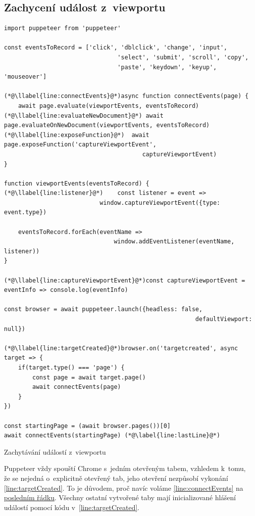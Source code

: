 \documentclass[12pt, a4paper, twoside]{article}
\newcommand{\codefigureSpacing}{1.2}
\begin{document}
	\subsection{Zachycení událost z~viewportu}
	\label{sub_sec:captureViewportEvents}
	\begin{codefigure}[H]
		\renewcommand\baselinestretch{\codefigureSpacing}
	\begin{lstlisting}[style=MyJavaScript]
import puppeteer from 'puppeteer'

const eventsToRecord = ['click', 'dblclick', 'change', 'input', 
                                'select', 'submit', 'scroll', 'copy', 
                                'paste', 'keydown', 'keyup', 'mouseover']

(*@\llabel{line:connectEvents}@*)async function connectEvents(page) {
	await page.evaluate(viewportEvents, eventsToRecord)
(*@\llabel{line:evaluateNewDocument}@*)	await page.evaluateOnNewDocument(viewportEvents, eventsToRecord)
(*@\llabel{line:exposeFunction}@*)	await page.exposeFunction('captureViewportEvent', 
	                                   captureViewportEvent)
}

function viewportEvents(eventsToRecord) {
(*@\llabel{line:listener}@*)	const listener = event => 
                           window.captureViewportEvent({type: event.type})
	
	eventsToRecord.forEach(eventName =>
	                           window.addEventListener(eventName, listener))
}

(*@\llabel{line:captureViewportEvent}@*)const captureViewportEvent = eventInfo => console.log(eventInfo)

const browser = await puppeteer.launch({headless: false, 
	                                                  defaultViewport: null})

(*@\llabel{line:targetCreated}@*)browser.on('targetcreated', async target => {
	if(target.type() === 'page') {
		const page = await target.page()
		await connectEvents(page)
	}
})

const startingPage = (await browser.pages())[0]
await connectEvents(startingPage) (*@\label{line:lastLine}@*)
	\end{lstlisting}
	\caption{Zachytávání událostí z~viewportu}
	\end{codefigure}
	\newpage
	Puppeteer vždy spouští Chrome s~jedním otevřeným tabem, vzhledem k~tomu, že se nejedná o~explicitně otevřený tab, jeho otevření nezpůsobí vykonání \ref{line:targetCreated}. To je důvodem, proč navíc voláme \ref{line:connectEvents} na \hyperref[line:lastLine]{posledním řádku}. Všechny ostatní vytvořené taby mají inicializované hlášení událostí pomocí kódu v~\ref{line:targetCreated}.
	
\end{document}
